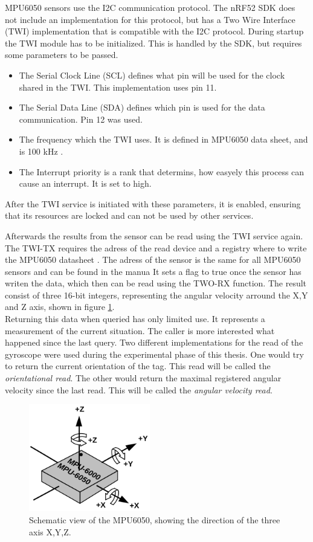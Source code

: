 MPU6050 sensors use the I2C communication protocol.
The nRF52 SDK does not include an implementation for this protocol, but has a Two Wire Interface (TWI) implementation that is compatible with the I2C protocol.
During startup the TWI module has to be initialized.
This is handled by the SDK, but requires some parameters to be passed.
\begin{itemize}
	\item The Serial Clock Line (SCL) defines what pin will be used for the clock shared in the TWI. This implementation uses pin 11.
	\item The Serial Data Line (SDA) defines which pin is used for the data communication. Pin 12 was used.
	\item The frequency which the TWI uses. It is defined in MPU6050 data sheet, and is 100 kHz \cite{MPU6050}.
	\item The Interrupt priority is a rank that determins, how easyely this process can cause an interrupt. It is set to high.
\end{itemize}
After the TWI service is initiated with these parameters, it is enabled, ensuring that its resources are locked and can not be used by other services.


Afterwards the results from the sensor can be read using the TWI service again.
The TWI-TX requires the adress of the read device and a registry where to write the MPU6050 datasheet \cite{MPU6050}.
The adress of the sensor is the same for all MPU6050 sensors and can be found in the manua
It sets a flag to true once the sensor has writen the data, which then can be read using the TWO-RX function.
The result consist of three 16-bit integers, representing the angular velocity arround the X,Y and Z axis, shown in figure \ref{f:MPU6050_orientation}.\\
Returning this data when queried has only limited use.
It represents a measurement of the current situation.
The caller is more interested what happened since the last query.
Two different implementations for the read of the gyroscope were used during the experimental phase of this thesis.
One would try to return the current orientation of the tag. This read will be called the \textit{orientational read}.
The other would return the maximal registered angular velocity since the last read. This will be called the \textit{angular velocity read}.


\begin{figure}[ht!]
\centering
\includegraphics[width=200px]{graphics/MPU6050_orientation.png}
\caption{Schematic view of the MPU6050, showing the direction of the three axis X,Y,Z.}
\label{f:MPU6050_orientation}
\end{figure}



